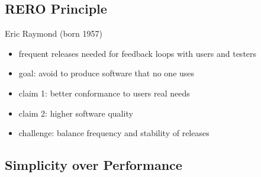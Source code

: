 \subsection{RERO Principle}
\begin{frame}{\insertsubsection}
	\begin{fancycolumns}
		\vspace{-7mm}

		\begin{note}{Eric Raymond (born 1957)}
		\end{note}
		\nextcolumn
		\begin{definition}{\insertsubsection}
			\begin{itemize}
				\item frequent releases needed for feedback loops with users and testers
				\item goal: avoid to produce software that no one uses
				\item claim 1: better conformance to users real needs
				\item claim 2: higher software quality
				\item challenge: balance frequency and stability of releases
			\end{itemize}
		\end{definition}
	\end{fancycolumns}
\end{frame}



\subsection{Simplicity over Performance}
\begin{frame}{\insertsubsection}
	\slideSimplicityOverPerformance
\end{frame}

